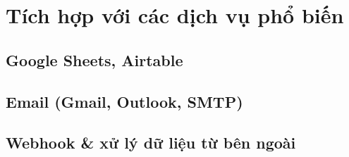 \chapter{Tích hợp với các dịch vụ phổ biến}

\section{Google Sheets, Airtable}



\section{Email (Gmail, Outlook, SMTP)}



\section{Webhook \& xử lý dữ liệu từ bên ngoài}
